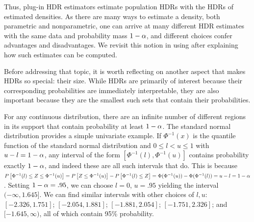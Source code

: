 


Thus, plug-in HDR estimators estimate population HDRs with the HDRs of estimated densities.
As there are many ways to estimate a density, both parametric and nonparametric,
one can arrive at many different HDR estimates with the same data and probability mass $1 - \alpha$,
and different choices confer advantages and disadvantages.
We revisit this notion in  using  after explaining how such estimates can be computed.

Before addressing that topic, it is worth reflecting on another aspect that makes HDRs so special: their size. While HDRs are primarily of interest because their corresponding probabilities are immediately interpretable, they are also important because they are the smallest such sets that contain their probabilities.

For any continuous distribution, there are an infinite number of different regions in its support that contain probability at least $1 - \alpha$.
The standard normal distribution provides a simple univariate example.
If $\Phi^{-1}(x)$ is the quantile function of the standard normal distribution and $0 \leq l < u \leq 1$ with $u - l = 1 - \alpha$,
any interval of the form $[\Phi^{-1}(l), \Phi^{-1}(u)]$ contains probability exactly $1-\alpha$, and indeed these are all such intervals that do.
This is because $P\left[\Phi^{-1}(l) \leq Z \leq \Phi^{-1}(u)\right] = P\left[Z \leq \Phi^{-1}(u)\right] - P\left[\Phi^{-1}(l) \leq Z\right] = \Phi(\Phi^{-1}(u)) - \Phi(\Phi^{-1}(l)) = u - l = 1 - \alpha$.
Setting $1 - \alpha = .95$, we can choose
$l = 0$, $u = .95$ yielding the interval $(-\infty, 1.645]$.
We can find similar intervals with other choices of $l, u$:
$[-2.326, 1.751]$;
$[-2.054, 1.881]$;
$[-1.881, 2.054]$;
$[-1.751, 2.326]$; and
$[-1.645, \infty)$,
all of which contain 95\% probability.

